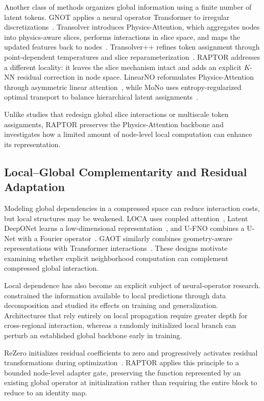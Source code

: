 \documentclass[a4paper,fleqn]{cas-sc}
\begin{document}
Another class of methods organizes global information using a finite number of latent tokens. GNOT applies a neural operator Transformer to irregular discretizations~\citep{ref19}. Transolver introduces Physics-Attention, which aggregates nodes into physics-aware slices, performs interactions in slice space, and maps the updated features back to nodes~\citep{ref20}. Transolver++ refines token assignment through point-dependent temperatures and slice reparameterization~\citep{ref21}. RAPTOR addresses a different locality: it leaves the slice mechanism intact and adds an explicit \(K\)-NN residual correction in node space. LinearNO reformulates Physics-Attention through asymmetric linear attention~\citep{ref22}, while MoNo uses entropy-regularized optimal transport to balance hierarchical latent assignments~\citep{ref23}.

Unlike studies that redesign global slice interactions or multiscale token assignments, RAPTOR preserves the Physics-Attention backbone and investigates how a limited amount of node-level local computation can enhance its representation.

\subsection{Local--Global Complementarity and Residual Adaptation}
\label{subsec:local_global}

Modeling global dependencies in a compressed space can reduce interaction costs, but local structures may be weakened. LOCA uses coupled attention~\citep{ref24}, Latent DeepONet learns a low-dimensional representation~\citep{ref25}, and U-FNO combines a U-Net with a Fourier operator~\citep{ref26}. GAOT similarly combines geometry-aware representations with Transformer interactions~\citep{ref27}. These designs motivate examining whether explicit neighborhood computation can complement compressed global interaction.

Local dependence has also become an explicit subject of neural-operator research. \citet{ref32} constrained the information available to local predictions through data decomposition and studied its effects on training and generalization. Architectures that rely entirely on local propagation require greater depth for cross-regional interaction, whereas a randomly initialized local branch can perturb an established global backbone early in training.

ReZero initializes residual coefficients to zero and progressively activates residual transformations during optimization~\citep{ref28}. RAPTOR applies this principle to a bounded node-level adapter gate, preserving the function represented by an existing global operator at initialization rather than requiring the entire block to reduce to an identity map.
\end{document}
